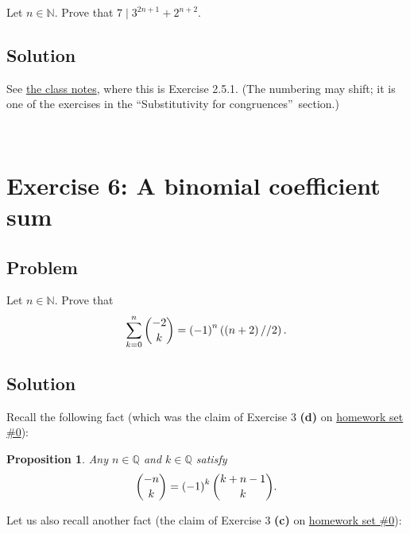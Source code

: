 \documentclass[paper=a4, fontsize=12pt]{scrartcl}%
\let\sumnonlimits\sum
\renewcommand{\sum}{\sumnonlimits\limits}
\theoremstyle{plainsl}
\newtheorem{proposition}[theorem]{Proposition}
\theoremstyle{definition}
\theoremstyle{remark}
\begin{document}
Let $n \in\mathbb{N}$. Prove that $7 \mid3^{2n+1} + 2^{n+2}$.

\subsection{Solution}

See \href{http://www.cip.ifi.lmu.de/~grinberg/t/19s/notes.pdf}{the class
notes}, where this is Exercise 2.5.1. (The numbering may shift; it is one of
the exercises in the \textquotedblleft Substitutivity for
congruences\textquotedblright\ section.)

\rule{0pt}{0.3pt} \\[0.4cm]

\section{Exercise 6: A binomial coefficient sum}

\subsection{Problem}

Let $n \in\mathbb{N}$. Prove that
\begin{align}
\sum_{k=0}^{n} \dbinom{-2}{k} = \left(  -1 \right)  ^{n} \left(  \left(  n+2
\right)  // 2 \right)  .
\end{align}


\subsection{Solution}

Recall the following fact (which was the claim of Exercise 3 \textbf{(d)} on
\href{http://www.cip.ifi.lmu.de/~grinberg/t/19s/hw0s.pdf}{homework set \#0}):

\begin{proposition}
\label{prop.sol.binom.-2choosek-sum.upneg}Any $n\in\mathbb{Q}$ and
$k\in\mathbb{Q}$ satisfy
\[
\dbinom{-n}{k}=\left(  -1\right)  ^{k}\dbinom{k+n-1}{k}.
\]

\end{proposition}

Let us also recall another fact (the claim of Exercise 3 \textbf{(c)} on
\href{http://www.cip.ifi.lmu.de/~grinberg/t/19s/hw0s.pdf}{homework set \#0}):
\end{document}
